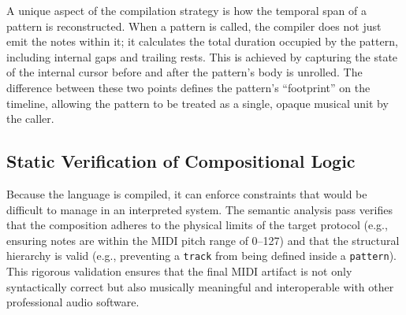 A unique aspect of the compilation strategy is how the temporal span of a pattern is reconstructed.
When a pattern is called, the compiler does not just emit the notes within it; it calculates the total duration occupied
by the pattern, including internal gaps and trailing rests.
This is achieved by capturing the state of the internal cursor before and after the pattern's body is unrolled.
The difference between these two points defines the pattern's ``footprint'' on the timeline, allowing the pattern to be
treated as a single, opaque musical unit by the caller.

\subsection{Static Verification of Compositional Logic}\label{subsec:static-verification-of-compositional-logic}

Because the language is compiled, it can enforce constraints that would be difficult to manage in an interpreted system.
The semantic analysis pass verifies that the composition adheres to the physical limits of the target protocol (e.g.,
ensuring notes are within the MIDI pitch range of 0--127) and that the structural hierarchy is valid (e.g., preventing a
\texttt{track} from being defined inside a \texttt{pattern}).
This rigorous validation ensures that the final MIDI artifact is not only syntactically correct but also musically
meaningful and interoperable with other professional audio software.
